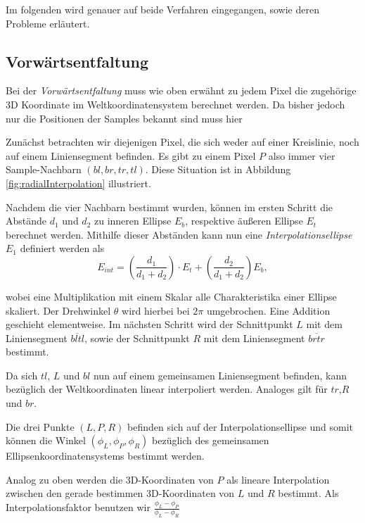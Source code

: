 Im folgenden wird genauer auf beide Verfahren eingegangen, sowie deren Probleme erläutert.

\subsection{Vorwärtsentfaltung}
Bei der \textit{Vorwärtsentfaltung} muss wie oben erwähnt zu jedem Pixel die zugehörige 3D Koordinate im Weltkoordinatensystem berechnet werden. Da bisher jedoch nur die Positionen der Samples bekannt sind muss hier 

Zunächst betrachten wir diejenigen Pixel, die sich weder auf einer Kreislinie, noch auf einem Liniensegment befinden. Es gibt zu einem Pixel $P$ also immer vier Sample-Nachbarn $(bl, br, tr, tl)$. Diese Situation ist in Abbildung \ref{fig:radialInterpolation} illustriert. 

Nachdem die vier Nachbarn bestimmt wurden, können im ersten Schritt die Abstände $d_1$ und $d_2$ zu inneren Ellipse $E_b$, respektive äußeren Ellipse $E_t$ berechnet werden. Mithilfe dieser Abständen kann nun eine \textit{Interpolationsellipse}~$E_1$ definiert werden als
\begin{equation*}
	E_{int} = \left(\frac{d_1}{d_1 + d_2}\right) \cdot E_t + \left(\frac{d_2}{d_1 + d_2}\right) E_b,
\end{equation*}

wobei eine Multiplikation mit einem Skalar alle Charakteristika einer Ellipse skaliert. Der Drehwinkel $\theta$ wird hierbei bei $2\pi$ umgebrochen. Eine Addition geschieht elementweise. Im nächsten Schritt wird der Schnittpunkt $L$ mit dem Liniensegment $\overline{bltl}$, sowie der Schnittpunkt $R$ mit dem Liniensegment $\overline{brtr}$ bestimmt. 

Da sich $tl$, $L$ und $bl$ nun auf einem gemeinsamen Liniensegment befinden, kann bezüglich der Weltkoordinaten linear interpoliert werden. Analoges gilt für $tr$,$R$ und $br$. 

Die drei Punkte $(L, P, R)$ befinden sich auf der Interpolationsellipse und somit können die  Winkel $(\phi_L, \phi_P, \phi_R)$ bezüglich des gemeinsamen Ellipsenkoordinatensystems bestimmt werden. 

Analog zu oben werden die 3D-Koordinaten von $P$ als lineare Interpolation zwischen den gerade bestimmen 3D-Koordinaten von $L$ und $R$ bestimmt. Als Interpolationsfaktor benutzen wir
$\frac{\phi_L - \phi_P}{\phi_L - \phi_R}$


